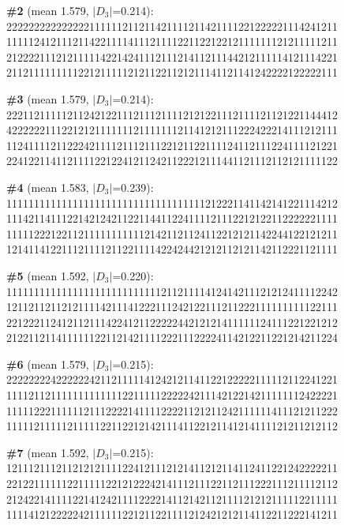 \documentclass[10pt]{article}
\begin{document}
\noindent\textbf{\#2} (mean 1.579, $|D_3|$=0.214):\\
222222222222222111111211211421111211421111221222221114241211\\
111112412111211422111141112111122112212212111111121211111211\\
212222111212111114221424111211121411211144212111114121114221\\
211211111111122121111121211221121211141121141242222122222111\medskip

\noindent\textbf{\#3} (mean 1.579, $|D_3|$=0.214):\\
222112111112112421221112111211112121221112111121121221144412\\
422222211122121211111112111111121141212111222422214111212111\\
112411112112224211112111211122121122111124112111224111121221\\
224122114112111122122412112421122212111441121112112121111122\medskip

\noindent\textbf{\#4} (mean 1.583, $|D_3|$=0.239):\\
111111111111111111111111111111111111212221141142141221114212\\
111421141112214212421122114411224111121112212122112222221111\\
111112221221121111111111121421121124112212121142244122121211\\
121411412211121111211221111422424421212112121142112221121111\medskip

\noindent\textbf{\#5} (mean 1.592, $|D_3|$=0.220):\\
111111111111111111111111111121121111412414211121212411112242\\
121121121121211114211141222111242122111211222111111111122111\\
221222112412112111422412112222244212121411111124111221221212\\
212211211411111122112142111122211122224114212211221214211224\medskip

\noindent\textbf{\#6} (mean 1.579, $|D_3|$=0.215):\\
222222224222222421121111141242121141122122222111112112241221\\
111121121111111111111221111122222421114212214211111112422221\\
111112221111112111222214111122221121211242111111411121211222\\
111112111112111112211221214211141122121141214111121211212112\medskip

\noindent\textbf{\#7} (mean 1.592, $|D_3|$=0.215):\\
121112111211212121111224121112121411212114112411221242222211\\
221221111112211111221212224214111211122112111222111211112112\\
212422141111221412421111222214112142112111121212111112211111\\
111141212222242111111221211221111212421212114112211222141211\medskip
\end{document}
